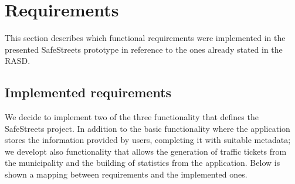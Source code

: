\documentclass[../ITD.tex]{subfiles}
\begin{document}
    \chapter{Requirements}\label{ch:requirements}
    This section describes which functional requirements were implemented in the presented SafeStreets prototype in reference to the ones already stated in the RASD.
    \section{Implemented requirements}\label{sec:implemented-requirements}
    We decide to implement two of the three functionality that defines the SafeStreets project. In addition to the basic functionality where the application stores the information provided by users, completing it with suitable metadata; we developt also functionality that allows the generation of traffic tickets from the municipality and the building of statistics from the application.
    \newline Below is shown a mapping between requirements and the implemented ones.
\end{document}
